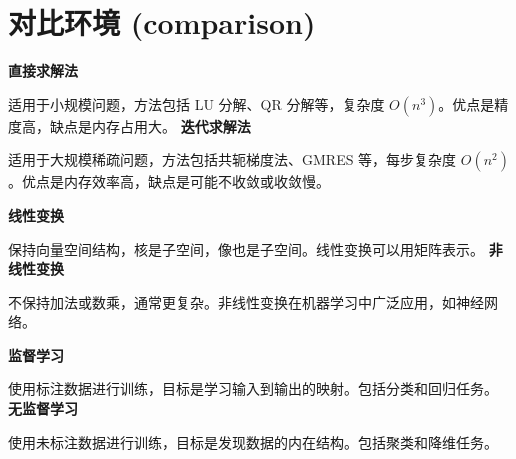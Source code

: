 \section{对比环境 (comparison)}

\begin{comparison}
\textbf{直接求解法}

适用于小规模问题，方法包括 LU 分解、QR 分解等，复杂度 \( O(n^3) \)。优点是精度高，缺点是内存占用大。
\tcblower
\textbf{迭代求解法}

适用于大规模稀疏问题，方法包括共轭梯度法、GMRES 等，每步复杂度 \( O(n^2) \)。优点是内存效率高，缺点是可能不收敛或收敛慢。
\end{comparison}

\begin{comparison}
\textbf{线性变换}

保持向量空间结构，核是子空间，像也是子空间。线性变换可以用矩阵表示。
\tcblower
\textbf{非线性变换}

不保持加法或数乘，通常更复杂。非线性变换在机器学习中广泛应用，如神经网络。
\end{comparison}

\begin{comparison}
\textbf{监督学习}

使用标注数据进行训练，目标是学习输入到输出的映射。包括分类和回归任务。
\tcblower
\textbf{无监督学习}

使用未标注数据进行训练，目标是发现数据的内在结构。包括聚类和降维任务。
\end{comparison}